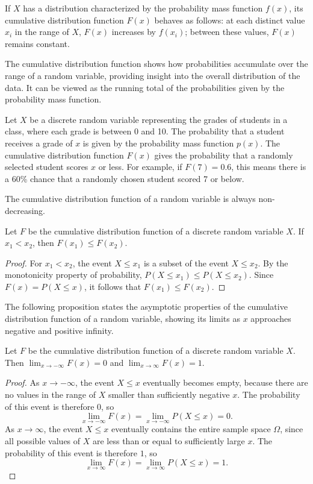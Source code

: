 If $X$ has a distribution characterized by the probability mass function $f(x)$, its cumulative distribution function $F(x)$ behaves as follows: at each distinct value $x_i$ in the range of $X$, $F(x)$ increases by $f(x_i)$; between these values, $F(x)$ remains constant.

The cumulative distribution function shows how probabilities accumulate over the range of a random variable, providing insight into the overall distribution of the data. It can be viewed as the running total of the probabilities given by the probability mass function.

\begin{example}
Let $X$ be a discrete random variable representing the grades of students in a class, where each grade is between 0 and 10. The probability that a student receives a grade of $x$ is given by the probability mass function $p(x)$. The cumulative distribution function $F(x)$ gives the probability that a randomly selected student scores $x$ or less. For example, if $F(7) = 0.6$, this means there is a 60\% chance that a randomly chosen student scored 7 or below.
\end{example}

The cumulative distribution function of a random variable is always non-decreasing.

\begin{proposition}
Let $F$ be the cumulative distribution function of a discrete random variable $X$. If $x_{1} < x_{2}$, then $F(x_{1}) \leq F(x_{2})$.
\end{proposition}
\begin{proof}
For $x_1 < x_2$, the event ${X \leq x_1}$ is a subset of the event ${X \leq x_2}$. By the monotonicity property of probability, $P(X \leq x_1) \leq P(X \leq x_2)$. Since $F(x) = P(X \leq x)$, it follows that $F(x_1) \leq F(x_2)$.
\end{proof}

The following proposition states the asymptotic properties of the cumulative distribution function of a random variable, showing its limits as $x$ approaches negative and positive infinity.

\begin{proposition}
Let $F$ be the cumulative distribution function of a discrete random variable $X$. Then $\lim_{x\rightarrow-\infty}F\left(x\right)=0$ and $\lim_{x\rightarrow\infty}F\left(x\right)=1$.
\end{proposition}
\begin{proof}
As $x \to -\infty$, the event ${X \leq x}$ eventually becomes empty, because there are no values in the range of $X$ smaller than sufficiently negative $x$. The probability of this event is therefore $0$, so
\[
\lim_{x \rightarrow -\infty} F(x) 
= \lim_{x \rightarrow -\infty} P(X \leq x) 
= 0.
\]
As $x \to \infty$, the event ${X \leq x}$ eventually contains the entire sample space $\Omega$, since all possible values of $X$ are less than or equal to sufficiently large $x$. The probability of this event is therefore $1$, so
\[
\lim_{x \rightarrow \infty} F(x) 
= \lim_{x \rightarrow \infty} P(X \leq x) 
= 1.
\]
\end{proof}

